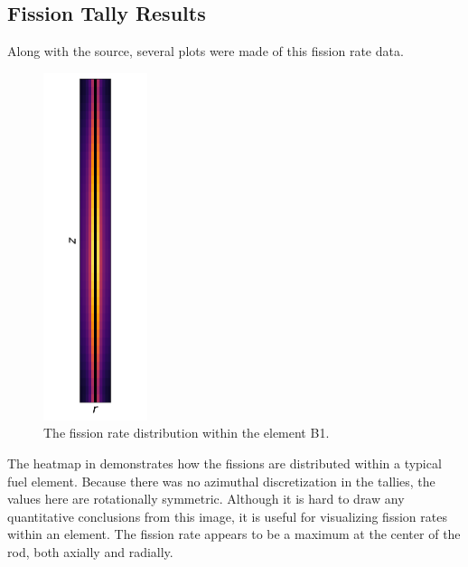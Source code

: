 \subsection{Fission Tally Results}
Along with the source, several plots were made of this fission rate data.

\begin{figure}[htb]
\centering
\includegraphics[height=4in]{tex/figures/rr_dist_B1.png}
\caption[Fission Rate Dist. B1]{The fission rate distribution within the element B1.}
\label{fig:rr_dist_b1}
\end{figure}

The heatmap in  demonstrates how the fissions are distributed within a typical fuel element.
Because there was no azimuthal discretization in the tallies, the values here are rotationally symmetric.
Although it is hard to draw any quantitative conclusions from this image, it is useful for visualizing fission rates within an element.
The fission rate appears to be a maximum at the center of the rod, both axially and radially.

